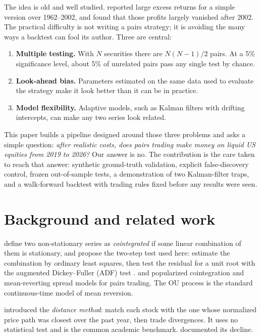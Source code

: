 \documentclass[11pt]{article}
\begin{document}
The idea is old and well studied. \citet{gatev2006} reported large excess returns for a
simple version over 1962--2002, and \citet{do2010} found that those profits largely vanished
after 2002. The practical difficulty is not writing a pairs strategy; it is avoiding the many
ways a backtest can fool its author. Three are central:
\begin{enumerate}
  \item \textbf{Multiple testing.} With $N$ securities there are $N(N-1)/2$ pairs. At a 5\%
        significance level, about 5\% of unrelated pairs pass any single test by chance.
  \item \textbf{Look-ahead bias.} Parameters estimated on the same data used to evaluate the
        strategy make it look better than it can be in practice.
  \item \textbf{Model flexibility.} Adaptive models, such as Kalman filters with drifting
        intercepts, can make any two series look related.
\end{enumerate}

This paper builds a pipeline designed around those three problems and asks a simple question:
\emph{after realistic costs, does pairs trading make money on liquid US equities from 2019
to 2026?} Our answer is no. The contribution is the care taken to reach that answer:
synthetic ground-truth validation, explicit false-discovery control, frozen out-of-sample
tests, a demonstration of two Kalman-filter traps, and a walk-forward backtest with trading
rules fixed before any results were seen.

\section{Background and related work}

\citet{engle1987} define two non-stationary series as \emph{cointegrated} if some linear
combination of them is stationary, and propose the two-step test used here: estimate the
combination by ordinary least squares, then test the residual for a unit root with the
augmented Dickey--Fuller (ADF) test \citep{dickey1979}. \citet{vidyamurthy2004} and
\citet{elliott2005} popularized cointegration and mean-reverting spread models for pairs
trading. The OU process \citep{uhlenbeck1930} is the standard continuous-time model of
mean reversion.

\citet{gatev2006} introduced the \emph{distance method}: match each stock with the one whose
normalized price path was closest over the past year, then trade divergences. It uses no
statistical test and is the common academic benchmark. \citet{do2010} documented its decline.
\end{document}
